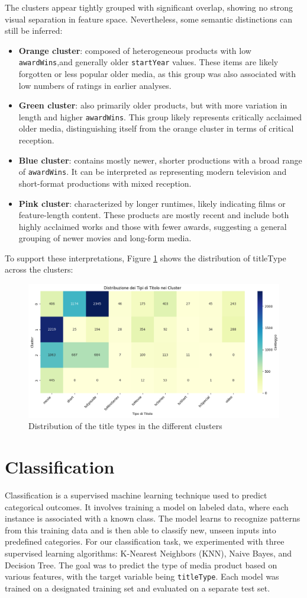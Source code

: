 \documentclass[10pt]{article}
\begin{document}
The clusters appear tightly grouped with significant overlap, showing no strong visual separation in feature space. Nevertheless, some semantic distinctions can still be inferred:
\begin{itemize}
    \item\textbf{Orange cluster}: composed of heterogeneous products with low \texttt{awardWins},and generally older \texttt{startYear} values. These items are likely forgotten or less popular older media, as this group was also associated with low numbers of ratings in earlier analyses.
    \item\textbf{Green cluster}: also primarily older products, but with more variation in length and higher \texttt{awardWins}. This group likely represents critically acclaimed older media, distinguishing itself from the orange cluster in terms of critical reception.
    \item\textbf{Blue cluster}: contains mostly newer, shorter productions with a broad range of \texttt{awardWins}. It can be interpreted as representing modern television and short-format productions with mixed reception. 
    \item\textbf{Pink cluster}: characterized by longer runtimes, likely indicating films or feature-length content. These products are mostly recent and include both highly acclaimed works and those with fewer awards, suggesting a general grouping of newer movies and long-form media.
\end{itemize}
To support these interpretations, Figure \ref{fig:distrib_knn} shows the distribution of titleType across the clusters:
\begin{figure}[ht!]
        \centering
        \includegraphics[width=0.4\linewidth]{distribution_kn.png}
        \caption{Distribution of the title types in the different clusters}
        \label{fig:distrib_knn}
\end{figure}

\section{Classification}
Classification is a supervised machine learning technique used to predict categorical outcomes. It involves training a model on labeled data, where each instance is associated with a known class. The model learns to recognize patterns from this training data and is then able to classify new, unseen inputs into predefined categories. \newline
For our classification task, we experimented with three supervised learning algorithms: K-Nearest Neighbors (KNN), Naive Bayes, and Decision Tree. The goal was to predict the type of media product based on various features, with the target variable being \texttt{titleType}. Each model was trained on a designated training set and evaluated on a separate test set.
\end{document}
